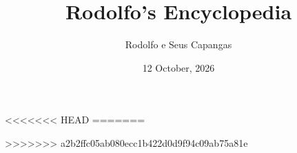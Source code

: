 \documentclass{book}
\title{Rodolfo's Encyclopedia}
\author{Rodolfo e Seus Capangas}
\date{12 October, 2026}
\begin{document}
\maketitle

\setcounter{tocdepth}{2}
\tableofcontents

\clearpage


<<<<<<< HEAD
=======



>>>>>>> a2b2ffc05ab080ecc1b422d0d9f94c09ab75a81e
\end{document}
